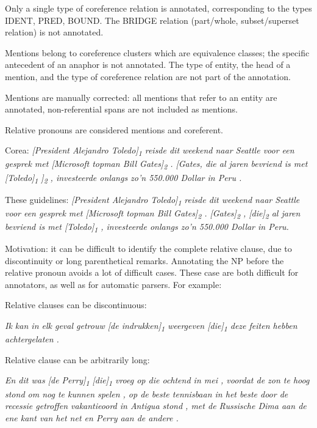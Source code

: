 \begin{itemize*}
\item Only a single type of coreference relation is annotated,
  corresponding to the types IDENT, PRED, BOUND. The BRIDGE relation
  (part/whole, subset/superset relation) is not annotated.
\item Mentions belong to coreference clusters which are equivalence
  classes; the specific antecedent of an anaphor is not annotated. The
  type of entity, the head of a mention, and the type of coreference
  relation are not part of the annotation.
\item Mentions are manually corrected: all mentions that refer to an entity
  are annotated, non-referential spans are not included as mentions.
\item Relative pronouns are considered mentions and coreferent.

  Corea: \emph{{[}President Alejandro Toledo{]}\textsubscript{1} reisde dit weekend naar
  Seattle voor een gesprek met {[}Microsoft topman Bill Gates{]}\textsubscript{2} .
  {[}Gates, die al jaren bevriend is met {[}Toledo{]}\textsubscript{1} {]}\textsubscript{2} ,
  investeerde onlangs zo'n 550.000 Dollar in Peru .}
  
  These guidelines: \emph{{[}President Alejandro Toledo{]}\textsubscript{1} reisde dit
  weekend naar Seattle voor een gesprek met {[}Microsoft topman Bill
  Gates{]}\textsubscript{2} . {[}Gates{]}\textsubscript{2} , {[}die{]}\textsubscript{2} al jaren bevriend is
  met {[}Toledo{]}\textsubscript{1} , investeerde onlangs zo'n 550.000 Dollar in
  Peru.}
  
  Motivation: it can be difficult to identify the complete relative
  clause, due to discontinuity or long parenthetical remarks. Annotating
  the NP before the relative pronoun avoids a lot of difficult cases.
  These case are both difficult for annotators, as well as for automatic parsers.
  For example:

    \begin{itemize*}
    \item Relative clauses can be discontinuous:
    
      \emph{Ik kan in elk geval getrouw {[}de indrukken{]}\textsubscript{1} weergeven
      {[}die{]}\textsubscript{1} deze feiten hebben achtergelaten .}
      
    \item Relative clause can be arbitrarily long:
    
      \emph{En dit was {[}de Perry{]}\textsubscript{1} {[}die{]}\textsubscript{1} vroeg op die ochtend
      in mei , voordat de zon te hoog stond om nog te kunnen spelen , op de
      beste tennisbaan in het beste door de recessie getroffen vakantieoord
      in Antigua stond , met de Russische Dima aan de ene kant van het net
      en Perry aan de andere .}
      

\end{itemize*}
\end{itemize*}
